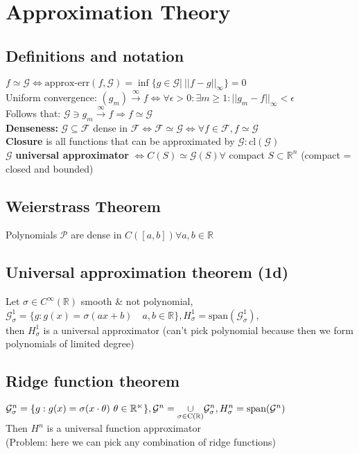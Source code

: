 \section*{Approximation Theory}
\subsection*{Definitions and notation}
$f \simeq \mathcal{G} \iff\text{
approx-err}(f,\mathcal{G})=\inf \{g\in\mathcal{G} \vert\ {||f-g||}_{\infty}\}=0$ \\
Uniform convergence: $(g_m)\overset{\infty}{\rightarrow}f \Leftrightarrow\forall\epsilon>0:\exists m\geq1:||g_m-f||_\infty<\epsilon$\\
Follows that: $\mathcal G \ni g_m\overset{\infty}{\rightarrow}f \Rightarrow f\simeq \mathcal G$\\
\textbf{Denseness: }$\mathcal{G} \subseteq\mathcal{F}$ dense in $\mathcal{F}  \iff \mathcal{F} \simeq \mathcal{G} \iff \forall f\in\mathcal{F}, f \simeq \mathcal{G}$  \\
\textbf{Closure} is all functions that can be approximated by $\mathcal G: \text{cl}(\mathcal G)$\\
$\mathcal{G}$ \textbf{universal approximator} $\iff C(S)\simeq\mathcal{G}(S) \forall$ compact 
$ S \subset \mathbb{R}^n$ (compact = closed and bounded)
\subsection*{Weierstrass Theorem}
Polynomials $\mathcal P$ are dense in $C([a,b]) \forall a,b\in\mathbb{R}$
\subsection*{Universal approximation theorem (1d)}
Let $\sigma \in C^{\infty}(\mathbb{R})$ smooth \& not polynomial,\\ $\mathcal{G}_{\sigma}^1=\{g: g(x) = \sigma(ax + b)\quad a,b\in\mathbb{R}\}, H_{\sigma}^1 = \text{span}(\mathcal{G}_{\sigma}^1)$, \\then $H_{\sigma}^1$ is a universal approximator (can't pick polynomial because then we form polynomials of limited degree)
\subsection*{Ridge function theorem}
$\mathcal{G}_{\sigma}^n=\{g: g(x)=\sigma(x\cdot \theta)\ \theta\in\mathbb{R^n}\}, \mathcal{G}^n = \underset{\rm \sigma\in 
C(\mathbb{R})}
{\rm \cup}
\mathcal{G}_{\sigma}^n, H_{\sigma}^n =\text{span}(\mathcal{G}^n)$ \\Then $H^n$ is a universal function approximator\\
(Problem: here we can pick any combination of ridge functions)
